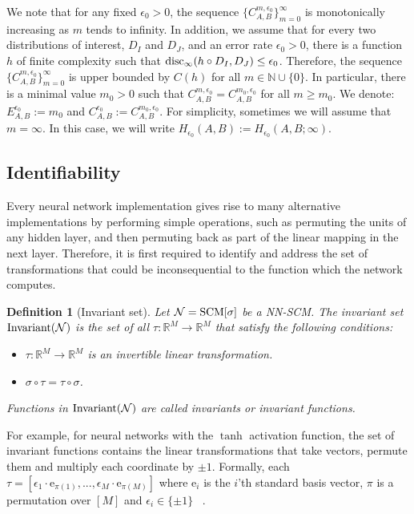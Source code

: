 \documentclass{article} %
\newtheorem{defn}{Definition}
\newcommand{\disc}{\textnormal{disc}}
\newcommand{\Inv}{\textnormal{Invariant}}
\begin{document}
 

We note that for any fixed $\epsilon_0 >0$, the sequence $\{ C^{m,\epsilon_0}_{A,B} \}^{\infty}_{m=0}$ is monotonically increasing as $m$ tends to infinity. In addition, we assume that for every two distributions of interest, $D_I$ and $D_J$, and an error rate $\epsilon_0 >0$, there is a function $h$ of finite complexity such that $\disc_{\infty}(h \circ D_I,D_J) \leq \epsilon_0$. Therefore, the sequence $\{ C^{m,\epsilon_0}_{A,B} \}^{\infty}_{m=0}$ is upper bounded by $C(h)$ for all $m \in \mathbb{N} \cup\{0\}$. In particular, there is a minimal value $m_0>0$ such that $C^{m,\epsilon_0}_{A,B} = C^{m_0,\epsilon_0}_{A,B}$ for all $m\geq m_0$. We denote: $E^{\epsilon_0}_{A,B} := m_0$ and $C^{\epsilon_0}_{A,B} := C^{m_0,\epsilon_0}_{A,B}$. For simplicity, sometimes we will assume that $m = \infty$. In this case, we will write $H_{\epsilon_0}(A,B) := H_{\epsilon_0}(A,B;\infty)$.

 

\subsection{Identifiability}

 

Every neural network implementation gives rise to many alternative implementations by performing simple operations, such as permuting the units of any hidden layer, and then permuting back as part of the linear mapping in the next layer. Therefore, it is first required to identify and address the set of transformations that could be inconsequential to the function which the network computes.

 

\begin{defn}[Invariant set]\label{def:invariant} Let $\mathcal{N} = \textnormal{SCM}[\sigma]$ be a NN-SCM. The invariant set $\Inv(\mathcal{N})$ is the set of all $\tau: \mathbb{R}^M \rightarrow \mathbb{R}^M$ that satisfy the following conditions: 

\begin{itemize}
\item $\tau:\mathbb{R}^{M} \rightarrow \mathbb{R}^M$ is an invertible linear transformation.
\item $\sigma \circ \tau = \tau \circ \sigma$.
\end{itemize}
Functions in $\Inv(\mathcal{N})$ are called invariants or invariant functions.
\end{defn} 

For example, for neural networks with the {\em {$\tanh$}} activation function, the set of invariant functions contains the linear transformations that take vectors, permute them and multiply each coordinate by $\pm 1$. Formally, each $\tau = [\epsilon_1 \cdot \text{e}_{\pi(1)}, ..., \epsilon_M \cdot \text{e}_{\pi(M)}]$ where $\text{e}_{i}$ is the $i$'th standard basis vector, $\pi$ is a permutation over $[M]$ and $\epsilon_i \in \{\pm 1\}$ ~\citep{DBLP:conf/nips/FeffermanM93}. 
\end{document}
